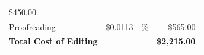 \documentclass[11pt,openany]{book}
\begin{document}
\begin{longtable}[]{@{}lrrr@{}}
\begin{minipage}[t]{0.22\columnwidth}
\$450.00\strut
\end{minipage}\tabularnewline
\begin{minipage}[t]{0.34\columnwidth}\raggedright
Proofreading\strut
\end{minipage} & \begin{minipage}[t]{0.16\columnwidth}\raggedleft
\$0.0113\strut
\end{minipage} & \begin{minipage}[t]{0.16\columnwidth}\raggedleft
100\%\strut
\end{minipage} & \begin{minipage}[t]{0.22\columnwidth}\raggedleft
\$565.00\strut
\end{minipage}\tabularnewline
\begin{minipage}[t]{0.34\columnwidth}\raggedright
\textbf{Total Cost of Editing}\strut
\end{minipage} & \begin{minipage}[t]{0.16\columnwidth}\raggedleft
\strut
\end{minipage} & \begin{minipage}[t]{0.16\columnwidth}\raggedleft
\strut
\end{minipage} & \begin{minipage}[t]{0.22\columnwidth}\raggedleft
\textbf{\$2,215.00}\strut
\end{minipage}\tabularnewline
\bottomrule
\end{longtable}
\end{document}
